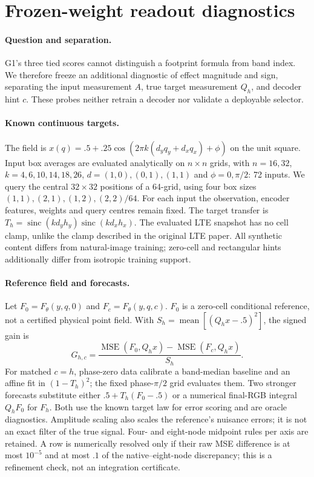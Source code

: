 \section{Frozen-weight readout diagnostics}\label{app:readout-probes}
\paragraph{Question and separation.}
G1's three tied scores cannot distinguish a footprint formula from band index. We therefore freeze an additional diagnostic of effect magnitude and sign, separating the input measurement $A$, true target measurement $Q_h$, and decoder hint $c$. These probes neither retrain a decoder nor validate a deployable selector.

\paragraph{Known continuous targets.}
The field is $x(q)=.5+.25\cos(2\pi k(d_yq_y+d_xq_x)+\phi)$ on the unit square. Input box averages are evaluated analytically on $n\times n$ grids, with $n=16,32$, $k=4,6,10,14,18,26$, $d=(1,0),(0,1),(1,1)$ and $\phi=0,\pi/2$: 72 inputs. We query the central $32\times 32$ positions of a 64-grid, using four box sizes $(1,1),(2,1),(1,2),(2,2)/64$. For each input the observation, encoder features, weights and query centres remain fixed. The target transfer is $T_h=\operatorname{sinc}(kd_yh_y)\operatorname{sinc}(kd_xh_x)$. The evaluated LTE snapshot has no cell clamp, unlike the clamp described in the original LTE paper. All synthetic content differs from natural-image training; zero-cell and rectangular hints additionally differ from isotropic training support.

\paragraph{Reference field and forecasts.}
Let $F_0=F_\theta(y,q,0)$ and $F_c=F_\theta(y,q,c)$. $F_0$ is a zero-cell conditional reference, not a certified physical point field. With $S_h=\operatorname{mean}[(Q_hx-.5)^2]$, the signed gain is
\[
 G_{h,c}=\frac{\operatorname{MSE}(F_0,Q_hx)-\operatorname{MSE}(F_c,Q_hx)}{S_h}.
\]
For matched $c=h$, phase-zero data calibrate a band-median baseline and an affine fit in $(1-T_h)^2$; the fixed phase-$\pi/2$ grid evaluates them. Two stronger forecasts substitute either $.5+T_h(F_0-.5)$ or a numerical final-RGB integral $Q_hF_0$ for $F_h$. Both use the known target law for error scoring and are oracle diagnostics. Amplitude scaling also scales the reference's nuisance errors; it is not an exact filter of the true signal. Four- and eight-node midpoint rules per axis are retained. A row is numerically resolved only if their raw MSE difference is at most $10^{-5}$ and at most $.1$ of the native--eight-node discrepancy; this is a refinement check, not an integration certificate.

